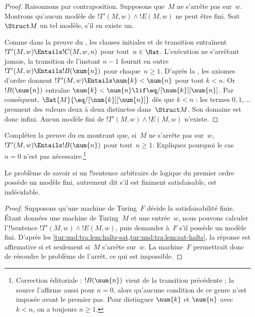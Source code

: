 \documentclass[../../../include/open-logic-section]{subfiles}
\begin{document}
\begin{proof}
Raisonnons par contraposition. Supposons que~$M$ ne s'arrête pas
sur~$w$. Montrons qu'aucun modèle de
$!T'(M,w)\land !E(M,w)$ ne peut être fini. Soit~$\Struct M$
un tel modèle, s'il en existe un.

Comme dans la preuve du , les clauses
initiales et de transition entraînent
$!T'(M,w)\Entails !C(M,w,n)$ pour tout~$n\in\Nat$.
L'exécution ne s'arrêtant jamais, la transition de l'instant
$n-1$ fournit en outre
$!T'(M,w)\Entails !B(\num{n})$ pour chaque~$n\ge1$.
D'après la , les axiomes d'ordre donnent
$!T'(M,w)\Entails\num{k}<\num{n}$ pour tout $k<n$.
Or $!B(\num{n})$ entraîne
$\num{k}<\num{n}\lif\eq/[\num{k}][\num{n}]$.
Par conséquent,
$\Sat{M}{\eq/[\num{k}][\num{n}]}$ dès que $k<n$ :
les termes $\num{0},\num{1},\dots$ prennent des valeurs
deux à deux distinctes dans~$\Struct M$. Son domaine est donc
infini. Aucun modèle fini de
$!T'(M,w)\land !E(M,w)$ n'existe.
\end{proof}

\begin{prob}
Complétez la preuve du 
en montrant que, si~$M$ ne s'arrête pas sur~$w$,
$!T'(M,w)\Entails !B(\num{n})$ pour tout~$n\ge1$.
Expliquez pourquoi le cas $n=0$ n'est pas nécessaire.\footnote{Correction éditoriale : $!B(\num{n})$ vient de la transition précédente ; la source l'affirme aussi pour $n=0$, alors qu'aucune condition de ce genre n'est imposée avant le premier pas. Pour distinguer $\num{k}$ et $\num{n}$ avec $k<n$, on a toujours $n\ge1$.}
\end{prob}

\begin{thm}
Le problème de savoir si un !!{sentence} arbitraire de logique
du premier ordre possède un modèle fini, autrement dit s'il
est finiment satisfaisable, est indécidable.
\end{thm}

\begin{proof}
Supposons qu'une machine de Turing~$F$ décide la satisfaisabilité
finie. Étant données une machine de Turing~$M$ et une entrée~$w$,
nous pouvons calculer l'!!{sentence}
$!T'(M,w)\land !E(M,w)$, puis demander à~$F$ s'il possède un
modèle fini. D'après les
\cref{tur:und:tra:lem:halts-sat,tur:und:tra:lem:sat-halts},
la réponse est affirmative si et seulement si~$M$ s'arrête sur~$w$.
La machine~$F$ permettrait donc de résoudre le problème de l'arrêt,
ce qui est impossible.
\end{proof}
\end{document}
